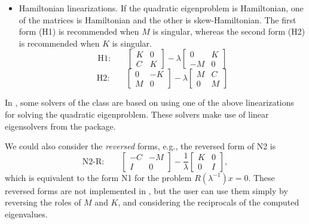 \begin{itemize}
\medskip
\item Hamiltonian linearizations. If the quadratic eigenproblem is Hamiltonian, one of the matrices is Hamiltonian and the other is skew-Hamiltonian. The first form (H1) is recommended when $M$ is singular, whereas the second form (H2) is recommended when $K$ is singular.
\begin{equation}
\label{eq:h1}
\mbox{H1:}\qquad
\left[\begin{array}{cc}K & 0\\C & K\end{array}\right]-\lambda\left[\begin{array}{cc} 0 & K\\-M & 0\end{array}\right]
\end{equation}
\begin{equation}
\label{eq:h2}
\mbox{H2:}\qquad
\left[\begin{array}{cc}0 & -K\\M & 0\end{array}\right]-\lambda\left[\begin{array}{cc}M & C\\ 0 & M\end{array}\right]
\end{equation}
\end{itemize}

In \slepc, some solvers of the  class are based on using one of the above linearizations for solving the quadratic eigenproblem. These solvers make use of linear eigensolvers from the  package.

We could also consider the \emph{reversed} forms, e.g., the reversed form of N2 is
\begin{equation}
\label{eq:n2r}
\mbox{N2-R:}\qquad
\left[\begin{array}{cc}-C & -M\\I & 0\end{array}\right]-\frac{1}{\lambda}\left[\begin{array}{cc}K & 0\\0 & I\end{array}\right],
\end{equation}
which is equivalent to the form N1 for the problem $R(\lambda^{-1})x=0$. These reversed forms are not implemented in \slepc, but the user can use them simply by reversing the roles of $M$ and $K$, and considering the reciprocals of the computed eigenvalues.

